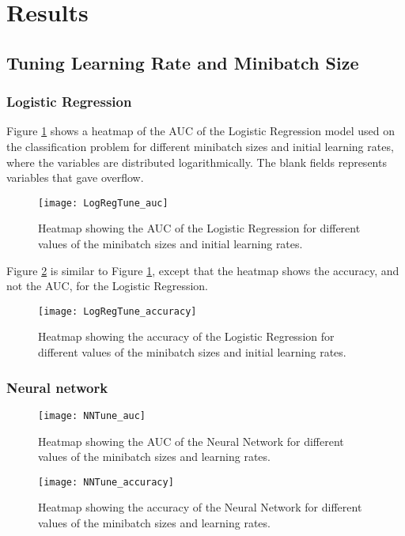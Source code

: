 \section{Results}
\label{sec:results}

\subsection{Tuning Learning Rate and Minibatch Size}

\subsubsection*{Logistic Regression}
Figure \ref{fig:TuneLogReg_auc} shows a heatmap of the AUC of the Logistic Regression model used on the classification problem for different minibatch sizes and initial learning rates, where the variables are distributed logarithmically. The blank fields represents variables that gave overflow. 
\begin{figure}[htbp]
	\centering
	\texttt{[image: LogRegTune\_auc]}
	\caption{Heatmap showing the AUC of the Logistic Regression for different
		values of the minibatch sizes and initial learning rates.}
	\label{fig:TuneLogReg_auc}
\end{figure}

Figure \ref{fig:TuneLogReg_accuracy} is similar to Figure \ref{fig:TuneLogReg_auc}, except that the heatmap shows the accuracy, and not the AUC, for the Logistic Regression. 
\begin{figure}[htbp]
	\centering
	\texttt{[image: LogRegTune\_accuracy]}
	\caption{Heatmap showing the accuracy of the Logistic Regression for different values of the minibatch sizes and initial learning rates.}
	\label{fig:TuneLogReg_accuracy}
\end{figure}

\subsubsection*{Neural network}
\begin{figure}[htbp]
	\centering
	\texttt{[image: NNTune\_auc]}
	\caption{Heatmap showing the AUC of the Neural Network for different
		values of the minibatch sizes and learning rates.}
	\label{fig:TuneNN_auc}
\end{figure}

\begin{figure}[htbp]
	\centering
	\texttt{[image: NNTune\_accuracy]}
	\caption{Heatmap showing the accuracy of the Neural Network for different
		values of the minibatch sizes and learning rates.}
	\label{fig:TuneNN_accuracy}
\end{figure}

